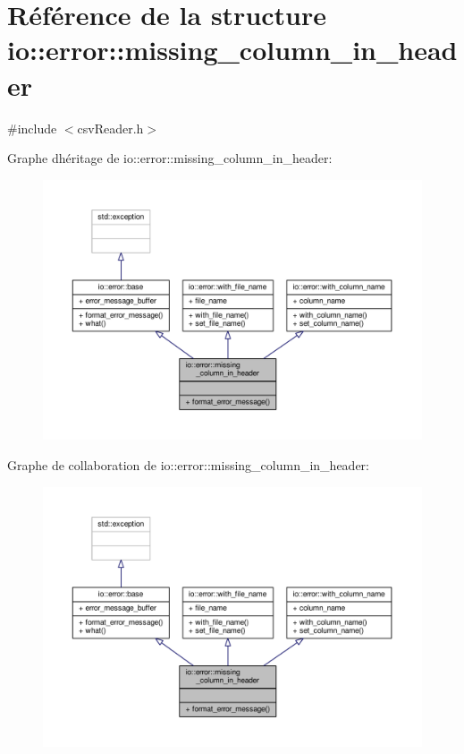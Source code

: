 \hypertarget{structio_1_1error_1_1missing__column__in__header}{}\section{Référence de la structure io\+:\+:error\+:\+:missing\+\_\+column\+\_\+in\+\_\+header}
\label{structio_1_1error_1_1missing__column__in__header}


{\ttfamily \#include $<$csv\+Reader.\+h$>$}



Graphe d\textquotesingle{}héritage de io\+:\+:error\+:\+:missing\+\_\+column\+\_\+in\+\_\+header\+:
\nopagebreak
\begin{figure}[H]
\begin{center}
\leavevmode
\includegraphics[width=350pt]{structio_1_1error_1_1missing__column__in__header__inherit__graph}
\end{center}
\end{figure}


Graphe de collaboration de io\+:\+:error\+:\+:missing\+\_\+column\+\_\+in\+\_\+header\+:
\nopagebreak
\begin{figure}[H]
\begin{center}
\leavevmode
\includegraphics[width=350pt]{structio_1_1error_1_1missing__column__in__header__coll__graph}
\end{center}
\end{figure}
